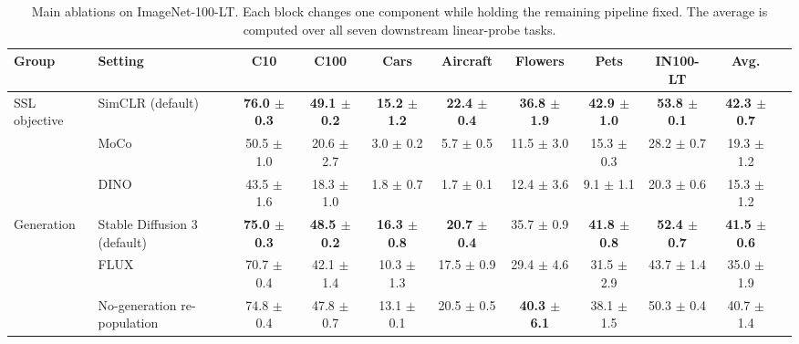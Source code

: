 \begin{table}[t]
\centering
\tiny
\setlength{\tabcolsep}{3.0pt}
\caption{Main ablations on ImageNet-100-LT. Each block changes one component while holding the remaining pipeline fixed. The average is computed over all seven downstream linear-probe tasks.}
\label{tab:main_ablation_combined}
\begin{adjustbox}{max width=\textwidth}
\begin{tabular}{l l c c c c c c c c c}
\toprule
Group & Setting & C10 & C100 & Cars & Aircraft & Flowers & Pets & IN100-LT & Avg. \\
\midrule
SSL objective & \rowcolor{blue!10} SimCLR (default) & \textbf{76.0 {\scriptsize$\pm$ 0.3}} & \textbf{49.1 {\scriptsize$\pm$ 0.2}} & \textbf{15.2 {\scriptsize$\pm$ 1.2}} & \textbf{22.4 {\scriptsize$\pm$ 0.4}} & \textbf{36.8 {\scriptsize$\pm$ 1.9}} & \textbf{42.9 {\scriptsize$\pm$ 1.0}} & \textbf{53.8 {\scriptsize$\pm$ 0.1}} & \textbf{42.3 {\scriptsize$\pm$ 0.7}} \\
 & MoCo & 50.5 {\scriptsize$\pm$ 1.0} & 20.6 {\scriptsize$\pm$ 2.7} & 3.0 {\scriptsize$\pm$ 0.2} & 5.7 {\scriptsize$\pm$ 0.5} & 11.5 {\scriptsize$\pm$ 3.0} & 15.3 {\scriptsize$\pm$ 0.3} & 28.2 {\scriptsize$\pm$ 0.7} & 19.3 {\scriptsize$\pm$ 1.2} \\
 & DINO & 43.5 {\scriptsize$\pm$ 1.6} & 18.3 {\scriptsize$\pm$ 1.0} & 1.8 {\scriptsize$\pm$ 0.7} & 1.7 {\scriptsize$\pm$ 0.1} & 12.4 {\scriptsize$\pm$ 3.6} & 9.1 {\scriptsize$\pm$ 1.1} & 20.3 {\scriptsize$\pm$ 0.6} & 15.3 {\scriptsize$\pm$ 1.2} \\
\midrule
Generation & \rowcolor{blue!10} Stable Diffusion 3 (default) & \textbf{75.0 {\scriptsize$\pm$ 0.3}} & \textbf{48.5 {\scriptsize$\pm$ 0.2}} & \textbf{16.3 {\scriptsize$\pm$ 0.8}} & \textbf{20.7 {\scriptsize$\pm$ 0.4}} & 35.7 {\scriptsize$\pm$ 0.9} & \textbf{41.8 {\scriptsize$\pm$ 0.8}} & \textbf{52.4 {\scriptsize$\pm$ 0.7}} & \textbf{41.5 {\scriptsize$\pm$ 0.6}} \\
 & FLUX & 70.7 {\scriptsize$\pm$ 0.4} & 42.1 {\scriptsize$\pm$ 1.4} & 10.3 {\scriptsize$\pm$ 1.3} & 17.5 {\scriptsize$\pm$ 0.9} & 29.4 {\scriptsize$\pm$ 4.6} & 31.5 {\scriptsize$\pm$ 2.9} & 43.7 {\scriptsize$\pm$ 1.4} & 35.0 {\scriptsize$\pm$ 1.9} \\
 & No-generation re-population & 74.8 {\scriptsize$\pm$ 0.4} & 47.8 {\scriptsize$\pm$ 0.7} & 13.1 {\scriptsize$\pm$ 0.1} & 20.5 {\scriptsize$\pm$ 0.5} & \textbf{40.3 {\scriptsize$\pm$ 6.1}} & 38.1 {\scriptsize$\pm$ 1.5} & 50.3 {\scriptsize$\pm$ 0.4} & 40.7 {\scriptsize$\pm$ 1.4} \\

\end{tabular}
\end{adjustbox}
\end{table}
